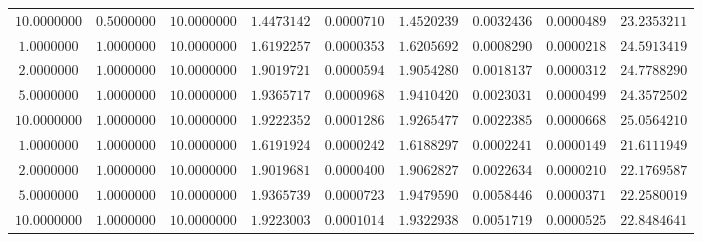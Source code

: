 \begin{tabular}{ccccccccc}
$10.0000000$ & $0.5000000$ & $10.0000000$ & $1.4473142$ & $0.0000710$ & $1.4520239$ & $0.0032436$ & $0.0000489$ & $23.2353211$\\
$1.0000000$ & $1.0000000$ & $10.0000000$ & $1.6192257$ & $0.0000353$ & $1.6205692$ & $0.0008290$ & $0.0000218$ & $24.5913419$\\
$2.0000000$ & $1.0000000$ & $10.0000000$ & $1.9019721$ & $0.0000594$ & $1.9054280$ & $0.0018137$ & $0.0000312$ & $24.7788290$\\
$5.0000000$ & $1.0000000$ & $10.0000000$ & $1.9365717$ & $0.0000968$ & $1.9410420$ & $0.0023031$ & $0.0000499$ & $24.3572502$\\
$10.0000000$ & $1.0000000$ & $10.0000000$ & $1.9222352$ & $0.0001286$ & $1.9265477$ & $0.0022385$ & $0.0000668$ & $25.0564210$\\
$1.0000000$ & $1.0000000$ & $10.0000000$ & $1.6191924$ & $0.0000242$ & $1.6188297$ & $0.0002241$ & $0.0000149$ & $21.6111949$\\
$2.0000000$ & $1.0000000$ & $10.0000000$ & $1.9019681$ & $0.0000400$ & $1.9062827$ & $0.0022634$ & $0.0000210$ & $22.1769587$\\
$5.0000000$ & $1.0000000$ & $10.0000000$ & $1.9365739$ & $0.0000723$ & $1.9479590$ & $0.0058446$ & $0.0000371$ & $22.2580019$\\
$10.0000000$ & $1.0000000$ & $10.0000000$ & $1.9223003$ & $0.0001014$ & $1.9322938$ & $0.0051719$ & $0.0000525$ & $22.8484641$\\
\end{tabular}
